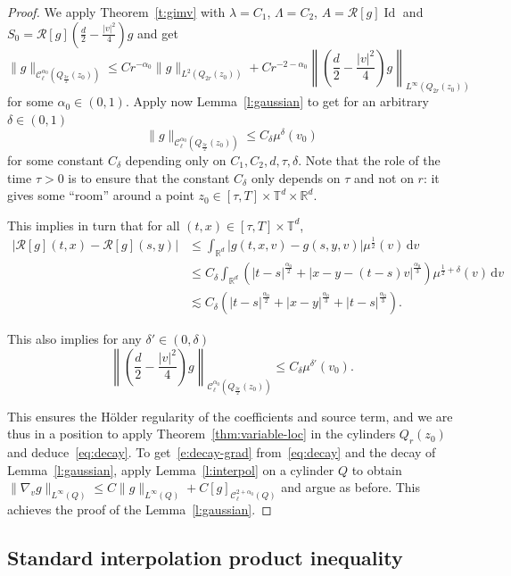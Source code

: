 \documentclass[AHL,Unicode,longabstracts,published]{cedram}
\newcommand{\R}{\mathbb{R}}
\newcommand{\T}{\mathbb{T}}
\newcommand{\cC}{\mathcal{C}}
\newcommand*\fR{\mathcal{R}}
\DeclareMathOperator{\Id}{Id}
\newcommand{\dd}{{\, \mathrm d}}
\begin{document}
\begin{proof}
We apply Theorem~\ref{t:gimv} with $\lambda = C_1$, $\Lambda = C_2$, $A = \fR[g] \Id$ and $S_0 = \fR[g](\frac{d}2-\frac{|v|^2}4)g$ and get
\[
\| g\|_{\cC_\ell^{{\alpha_0}}\left(Q_{\frac{3r}2}(z_0)\right)}
\le C r^{-{\alpha_0}} \| g \|_{L^2\left(Q_{2r}(z_0)\right)} + C r^{-2-{\alpha_0}}
\left\|\left(\frac{d}2 - \frac{|v|^2}4\right)g \right\|_{L^\infty\left(Q_{2r}(z_0)\right)}
\]
for some $\alpha_0 \in (0,1)$. Apply now Lemma~\ref{l:gaussian} to get for an arbitrary $\delta \in (0,1)$
\[
\| g\|_{\cC_\ell^{{\alpha_0}}\left(Q_{\frac{3r}2}(z_0)\right)} \le C_\delta \mu^{\delta}(v_0)
\]
for some constant $C_\delta$ depending only on $C_1, C_2, d,\tau, \delta$. Note that the role of the time $\tau>0$ is to ensure that the constant $C_\delta$ only depends on $\tau$ and not on $r$: it gives some ``room'' around a point $z_0 \in [\tau,T] \times \T^d \times \R^d$.

This implies in turn that for all $(t,x) \in [\tau,T] \times \T^d$,
\begin{align*}
\left|\fR[g](t,x) - \fR[g](s,y)\right| & \le \int_{\R^d} \left| g (t,x,v) - g (s,y,v)\right|\mu^{\frac12} (v) \dd v \\
& \le C_\delta \int_{\R^d} \left(|t-s|^{\frac{\alpha_0}2} + |x-y - (t-s)v|^{\frac{\alpha_0}3} \right) \mu^{\frac12+\delta} (v) \dd v \\
& \lesssim C_\delta \left(|t-s|^{\frac{\alpha_0}2} + |x-y|^{\frac{\alpha_0}3} + |t-s|^{\frac{\alpha_0}3}\right).
\end{align*}

This also implies for any $\delta' \in (0,\delta)$
\[
\left\|\left(\frac{d}2-\frac{|v|^2}4\right) g\right\| _{\cC_\ell^{{\alpha_0}}\left(Q_{\frac{3r}2}(z_0)\right)} \le C_\delta \mu^{\delta'}(v_0).
\]

This ensures the H\"older regularity of the coefficients and source term, and we are thus in a position to apply Theorem~\ref{thm:variable-loc} in the cylinders $Q_r (z_0)$ and deduce~\eqref{eq:decay}. To get~\eqref{e:decay-grad} from~\eqref{eq:decay} and the decay of Lemma~\ref{l:gaussian}, apply Lemma~\ref{l:interpol} on a cylinder $Q$ to obtain $\| \nabla_v g \|_{L^\infty(Q)} \le C \|g\|_{L^\infty(Q)} + C [g]_{\cC_\ell^{2+\alpha_0}(Q)}$ and argue as before. This achieves the proof of the Lemma~\ref{l:gaussian}.
\end{proof}


\subsection{Standard interpolation product inequality}\label{sec:stand-interp-prod}
\end{document}
